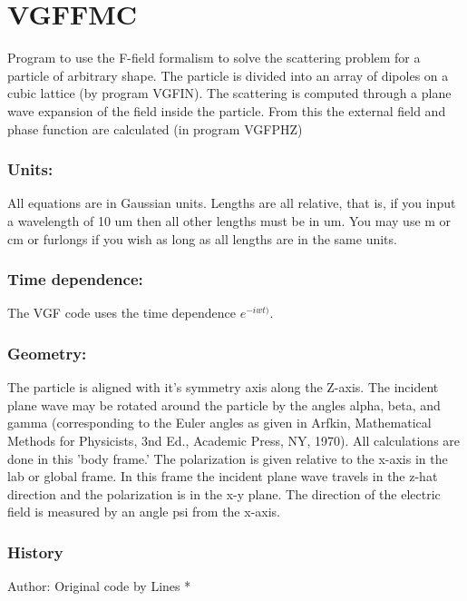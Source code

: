 \documentclass{article}
\begin{document}
\section{VGFFMC}

Program to use the F-field formalism to solve the scattering problem for a
particle of arbitrary shape. The particle is divided into an array of
dipoles on a cubic lattice (by program VGFIN). The scattering is computed
through a plane wave expansion of the field inside the particle. From this
the external field and phase function are calculated (in program VGFPHZ)

\subsubsection{Units:}

All equations are in Gaussian units. Lengths are all relative, that is, if
you input a wavelength of 10 um then all other lengths must be in um. You
may use m or cm or furlongs if you wish as long as all lengths are in the
same units.

\subsubsection{Time dependence:}

The VGF code uses the time dependence $e^{-iwt)}$.

\subsubsection{Geometry:}

The particle is aligned with it's symmetry axis along the Z-axis. The
incident plane wave may be rotated around the particle by the angles alpha,
beta, and gamma (corresponding to the Euler angles as given in Arfkin,
Mathematical Methods for Physicists, 3nd Ed., Academic Press, NY, 1970). All
calculations are done in this 'body frame.' The polarization is given
relative to the x-axis in the lab or global frame. In this frame the
incident plane wave travels in the z-hat direction and the polarization is
in the x-y plane. The direction of the electric field is measured by an
angle psi from the x-axis.

\subsubsection{History}

Author: Original code by Lines *
\end{document}
